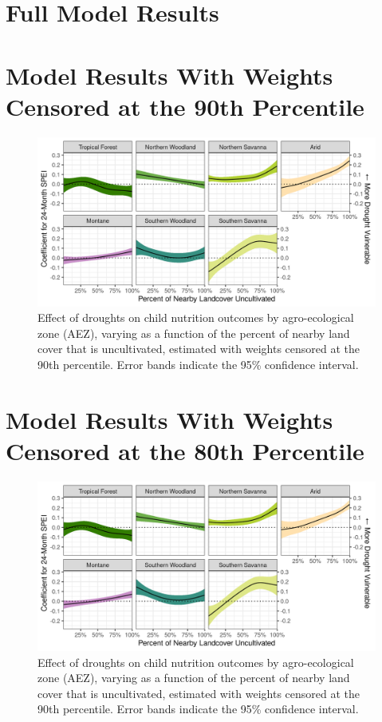 \documentclass{article}
\begin{document}
\section{Full Model Results}


\newpage

\section{Model Results With Weights Censored at the 90th Percentile}
\begin{figure}[h!]
	\begin{center}
	\includegraphics[width=\linewidth]{AEZ_effects_q90.png}
	\end{center}
	\caption{Effect of droughts on child nutrition outcomes by agro-ecological zone (AEZ), varying as a function of the percent of nearby land cover that is uncultivated, estimated with weights censored at the 90th percentile.  Error bands indicate the 95\% confidence interval.}
\end{figure}



\newpage

\section{Model Results With Weights Censored at the 80th Percentile}
\begin{figure}[h!]
	\begin{center}
	\includegraphics[width=\linewidth]{AEZ_effects_q80.png}
	\end{center}
	\caption{Effect of droughts on child nutrition outcomes by agro-ecological zone (AEZ), varying as a function of the percent of nearby land cover that is uncultivated, estimated with weights censored at the 90th percentile.  Error bands indicate the 95\% confidence interval.}
\end{figure}


\end{document}
